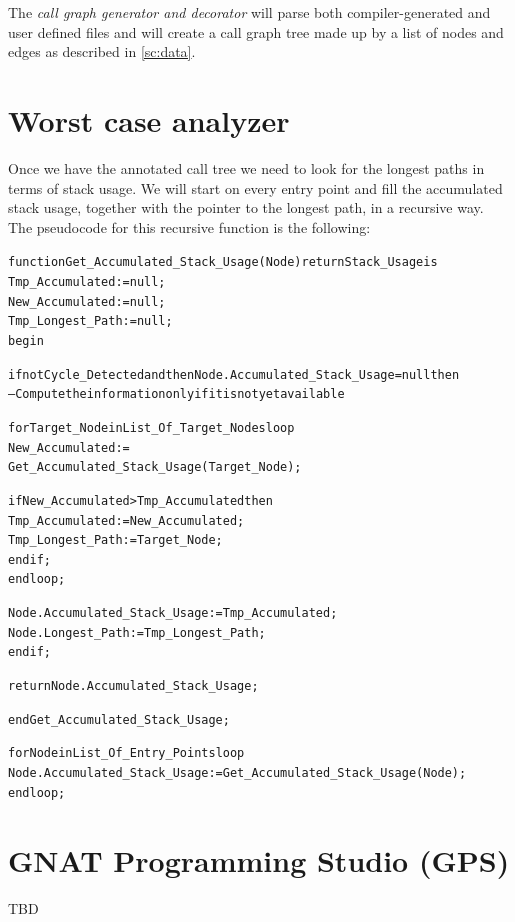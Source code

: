 The \emph{call graph generator and decorator} will parse both
compiler-generated and user defined files and will create a call graph
tree made up by a list of nodes and edges as described in \ref{sc:data}.

\section{Worst case analyzer}

Once we have the annotated call tree we need to look for the longest
paths in terms of stack usage. We will start on every entry point and
fill the accumulated stack usage, together with the pointer to the
longest path, in a recursive way. The pseudocode for this recursive
function is the following:
\begin{alltt}
   function Get_Accumulated_Stack_Usage (Node) return Stack_Usage is
     Tmp_Accumulated  := null;
     New_Accumulated  := null;
     Tmp_Longest_Path := null;
   begin

     if not Cycle_Detected and then Node.Accumulated_Stack_Usage = null then
       --  Compute the information only if it is not yet available

       for Target_Node in List_Of_Target_Nodes loop
         New_Accumulated :=
           Get_Accumulated_Stack_Usage (Target_Node);

         if New_Accumulated > Tmp_Accumulated then
           Tmp_Accumulated  := New_Accumulated;
           Tmp_Longest_Path := Target_Node;
         end if;
       end loop;

       Node.Accumulated_Stack_Usage := Tmp_Accumulated;
       Node.Longest_Path := Tmp_Longest_Path;
     end if;

     return Node.Accumulated_Stack_Usage;

   end Get_Accumulated_Stack_Usage;


   for Node in List_Of_Entry_Points loop
     Node.Accumulated_Stack_Usage := Get_Accumulated_Stack_Usage (Node);
   end loop; 
\end{alltt}


\section{GNAT Programming Studio (GPS)}

TBD
